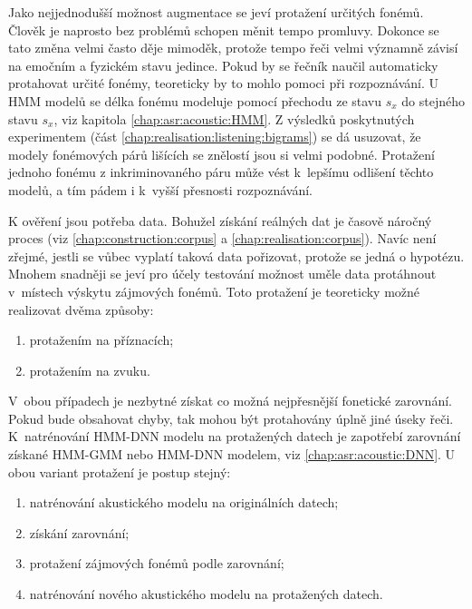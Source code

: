 Jako nejjednodušší možnost augmentace se jeví protažení určitých fonémů.
Člověk je naprosto bez problémů schopen měnit tempo promluvy.
Dokonce se tato změna velmi často děje mimoděk, protože tempo řeči velmi významně závisí na emočním a fyzickém stavu jedince.
Pokud by se řečník naučil automaticky protahovat určité fonémy, teoreticky by to mohlo pomoci při rozpoznávání.
U HMM modelů se délka fonému modeluje pomocí přechodu ze stavu $s_x$ do stejného stavu $s_x$, viz kapitola \ref{chap:asr:acoustic:HMM}.
Z výsledků poskytnutých  experimentem (část \ref{chap:realisation:listening:bigrams}) se dá usuzovat, že modely fonémových párů lišících se znělostí jsou si velmi podobné.
Protažení jednoho fonému z inkriminovaného páru může vést  k~lepšímu odlišení těchto modelů,
a tím pádem i  k~vyšší přesnosti rozpoznávání.

K ověření jsou potřeba data.
Bohužel získání reálných dat je časově náročný proces (viz \ref{chap:construction:corpus} a \ref{chap:realisation:corpus}).
Navíc není zřejmé, jestli se vůbec vyplatí taková data pořizovat, protože se jedná o hypotézu.
Mnohem snadněji se jeví pro účely testování možnost uměle data protáhnout v~místech výskytu zájmových fonémů.
Toto protažení je teoreticky možné realizovat dvěma způsoby:

\begin{enumerate}
  \item protažením na příznacích;
  \item protažením na zvuku.
\end{enumerate}

\noindent V~obou případech je nezbytné získat co možná nejpřesnější fonetické zarovnání. Pokud bude obsahovat chyby, tak mohou být protahovány úplně jiné úseky řeči. K~natrénování HMM-DNN modelu na protažených datech je zapotřebí zarovnání získané HMM-GMM nebo HMM-DNN modelem, viz \ref{chap:asr:acoustic:DNN}. U obou variant protažení je postup stejný:

\begin{enumerate}
  \item natrénování akustického modelu na originálních datech;
  \item získání zarovnání;
  \item protažení zájmových fonémů podle zarovnání;
  \item natrénování nového akustického modelu na protažených datech.
\end{enumerate}


